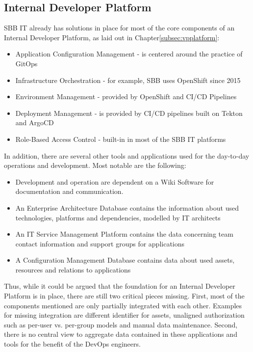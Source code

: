 \documentclass[a4paper,10pt]{article}
\begin{document}
    \subsection{Internal Developer Platform}
    \label{subsec:sbbplatform}
    SBB IT already has solutions in place for most of the core components of an Internal Developer Platform, as laid out
    in Chapter\ref{subsec:vpplatform}:
    \begin{itemize}
        \item Application Configuration Management - is centered around the practice of GitOps\parencite{hashicorpvault}
        \item Infrastructure Orchestration - for example, SBB uses OpenShift since 2015\parencite{rhsbbopenshift}
        \item Environment Management - provided by OpenShift and CI/CD Pipelines
        \item Deployment Management - is provided by CI/CD pipelines built on Tekton and ArgoCD\parencite{sbbtekton}
        \item Role-Based Access Control - built-in in most of the SBB IT platforms
    \end{itemize}
    In addition, there are several other tools and applications used for the day-to-day operations and development.
    Most notable are the following:
    \begin{itemize}
        \item Development and operation are dependent on a Wiki Software for documentation and communication.
        \item An Enterprise Architecture Database contains the information about used technologies, platforms and
        dependencies, modelled by IT architects
        \item An IT Service Management Platform contains the data concerning team contact information and support groups for applications
        \item A Configuration Management Database contains data about used assets, resources and relations to applications
    \end{itemize}
    Thus, while it could be argued that the foundation for an Internal Developer Platform is in place, there are still
    two critical pieces missing.
    First, most of the components mentioned are only partially integrated with each other.
    Examples for missing integration are different identifier for assets, unaligned authorization such as per-user vs.
    per-group models and manual data maintenance.
    Second, there is no central view to aggregate data contained in these applications and tools for the benefit of
    the DevOps engineers.
\end{document}
